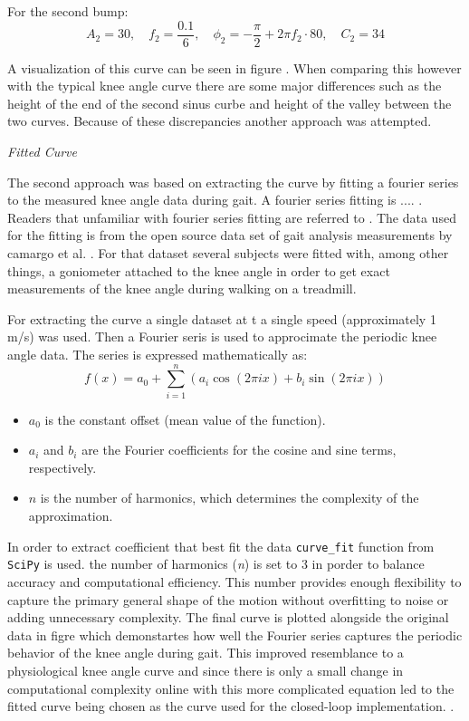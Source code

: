For the second bump:
\[
A_2 = 30, \quad f_2 = \frac{0.1}{6}, \quad \phi_2 = -\frac{\pi}{2} + 2\pi f_2 \cdot 80, \quad C_2 = 34
\]

A visualization of this curve can be seen in figure . When comparing this however with the typical knee angle curve there are some major differences such as the height of the end of the second sinus curbe and height of the valley between the two curves. Because of these discrepancies another approach was attempted.
\newline

\textit{Fitted Curve}

The second approach was based on extracting the curve by fitting a fourier series to the measured knee angle data during gait. A fourier series fitting is .... . Readers that unfamiliar with fourier series fitting are referred to . The data used for the fitting is from the open source data set of gait analysis measurements by camargo et al. \cite{camargo_comprehensive_2021}. For that dataset several subjects were fitted with, among other things, a goniometer attached to the knee angle in order to get exact measurements of the knee angle during walking on a treadmill. 


For extracting the curve a single dataset at t a single speed (approximately 1 m/s) was used. Then a Fourier seris is used to approcimate the periodic knee angle data. The series is expressed mathematically as:
\begin{equation}
f(x) = a_0 + \sum_{i=1}^{n} \left( a_i \cos(2\pi i x) + b_i \sin(2\pi i x) \right)
\end{equation}

\begin{itemize}
    \item \(a_0\) is the constant offset (mean value of the function).
    \item \(a_i\) and \(b_i\) are the Fourier coefficients for the cosine and sine terms, respectively.
    \item \(n\) is the number of harmonics, which determines the complexity of the approximation.
\end{itemize}

In order to extract coefficient that best fit the data \texttt{curve\_fit}  function from \texttt{SciPy} is used. the number of harmonics (\textit{n}) is set to 3 in porder to balance accuracy and computational efficiency. This number provides enough flexibility to capture the primary general shape of the motion without overfitting to noise or adding unnecessary complexity. The  final curve is plotted alongside the original data in figre  which demonstartes how well the Fourier series captures the periodic behavior of the knee angle during gait. This improved resemblance to a physiological knee angle curve and since there is only a small change in computational complexity online with this more complicated equation led to the fitted curve being chosen as the curve used for the closed-loop implementation.
.
\newline

